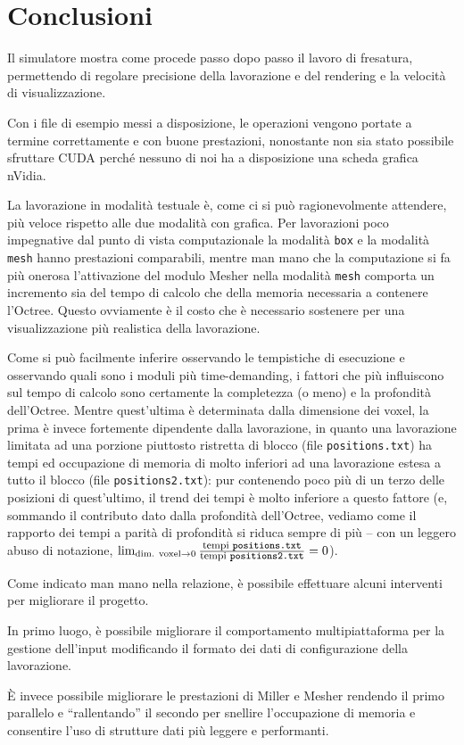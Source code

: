 \section{Conclusioni}
Il simulatore mostra come procede passo dopo passo il lavoro di fresatura, permettendo di regolare precisione della lavorazione e del rendering e la velocità di visualizzazione.

Con i file di esempio messi a disposizione, le operazioni vengono portate a termine correttamente e con buone prestazioni, nonostante non sia stato possibile sfruttare CUDA perché nessuno di noi ha a disposizione una scheda grafica nVidia.

La lavorazione in modalità testuale è, come ci si può ragionevolmente attendere, più veloce rispetto alle due modalità con grafica. Per lavorazioni poco impegnative dal punto di vista computazionale la modalità \texttt{box} e la modalità \texttt{mesh} hanno prestazioni comparabili, mentre man mano che la computazione si fa più onerosa l'attivazione del modulo Mesher nella modalità \texttt{mesh} comporta un incremento sia del tempo di calcolo che della memoria necessaria a contenere l'Octree. Questo ovviamente è il costo che è necessario sostenere per una visualizzazione più realistica della lavorazione.

Come si può facilmente inferire osservando le tempistiche di esecuzione e osservando quali sono i moduli più time-demanding, i fattori che più influiscono sul tempo di calcolo sono certamente la completezza (o meno) e la profondità dell'Octree. Mentre quest'ultima è determinata dalla dimensione dei voxel, la prima è invece fortemente dipendente dalla lavorazione, in quanto una lavorazione limitata ad una porzione piuttosto ristretta di blocco (file \texttt{positions.txt}) ha tempi ed occupazione di memoria di molto inferiori ad una lavorazione estesa a tutto il blocco (file \texttt{positions2.txt}): pur contenendo poco più di un terzo delle posizioni di quest'ultimo, il trend dei tempi è molto inferiore a questo fattore (e, sommando il contributo dato dalla profondità dell'Octree, vediamo come il rapporto dei tempi a parità di profondità si riduca sempre di più -- con un leggero abuso di notazione, $\lim_{\mbox{{\scriptsize dim. voxel}} \rightarrow 0}\frac{\mbox{\footnotesize{tempi \texttt{positions.txt}}}}{\mbox{\footnotesize{tempi \texttt{positions2.txt}}}} = 0$).

Come indicato man mano nella relazione, è possibile effettuare alcuni interventi per migliorare il progetto.

In primo luogo, è possibile migliorare il comportamento multipiattaforma per la gestione dell'input modificando il formato dei dati di configurazione della lavorazione.

È invece possibile migliorare le prestazioni di Miller e Mesher rendendo il primo parallelo e ``rallentando'' il secondo per snellire l'occupazione di memoria e consentire l'uso di strutture dati più leggere e performanti.
